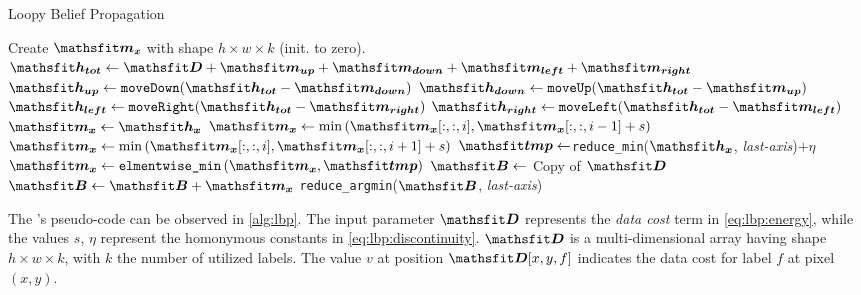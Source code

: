 \begin{algorithm}[H]
\caption{Loopy Belief Propagation}\label{alg:lbp}
\begin{algorithmic}[1]
\Statex
{}
\State Create $\mat{m_\mathit{x}}$ with shape $h\times w\times k$ (init. to zero). 
\Statex
{}
	\State $\mat{h_{tot}} \leftarrow \mat D + \mat{m_{up}} +\mat{m_{down}} + \mat{m_{left}} + \mat{m_{right}}$
	\State $\mat{h_{up}} \leftarrow \texttt{moveDown}(\mat{h_{tot}}-\mat {m_{down}})$\label{ist:h_start}
	\State $\mat{h_{down}} \leftarrow \texttt{moveUp}(\mat{h_{tot}}-\mat {m_{up}})$
	\State $\mat{h_{left}} \leftarrow \texttt{moveRight}(\mat{h_{tot}}-\mat {m_{right}})$
	\State $\mat{h_{right}} \leftarrow \texttt{moveLeft}(\mat{h_{tot}}-\mat {m_{left}})$\label{ist:h_end}
	\Statex
			\label{ist:start_thing}
		\State $\mat {m_x} \leftarrow \mat{h_x}$
		\State $\mat{m_x} \leftarrow \min\left( \mat{m_x}[:, :, i], \mat{m_x}[:, :, i-1] + s\right)$
		\EndFor
				\State $\mat{m_x} \leftarrow \min\left( \mat{m_x}[:, :, i], \mat{m_x}[:, :, i+1] +  s\right)$
		\EndFor 
	\EndFor
	\Statex
		\State $\mat{tmp}\leftarrow$\texttt{reduce\_min}($\mat{h_x}$, \textit{last-axis})$+\eta$ 
		\State $\mat{m_x} \leftarrow \texttt{elmentwise\_min}\left(\mat{m_x}, \mat{tmp}\right)$
		\label{ist:end_thing}
	\EndFor
\EndFor
\Statex
\State $\mat B \leftarrow$ Copy of $\mat D$ 
 \label{istr:belief_comp1}
	\State $\mat B \leftarrow \mat B+\mat{m_x}$\label{istr:belief_comp2}
\EndFor
\State \Return \texttt{reduce\_argmin}($\mat B$, \textit{last-axis})
\EndProcedure
\end{algorithmic}
\end{algorithm}

The \LBP's pseudo-code can be observed in \cref{alg:lbp}. 
The input parameter $\mat D$ represents the \emph{data cost} term in \cref{eq:lbp:energy}, while the values $s$, $\eta$ represent the homonymous constants in \cref{eq:lbp:discontinuity}. $\mat D$ is a multi-dimensional array having shape $h\times w \times k$, with  $k$ the number of utilized labels. The value $v$ at position $\mat D[x,y,f]$ indicates the data cost for label $f$ at pixel $(x,y)$.\\


